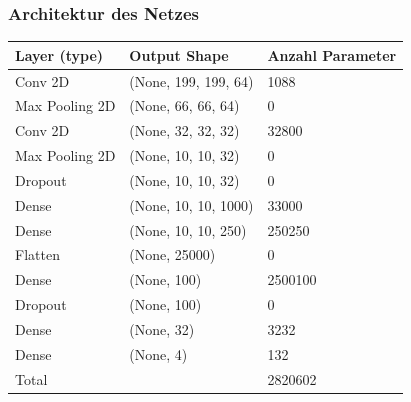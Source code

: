 \documentclass[aspectratio=1610, professionalfonts, 9pt]{beamer}
\begin{document}
\begin{frame}
    \frametitle{Architektur des Netzes}
    \begin{table}[htb]
        \centering
        \begin{tabular}{l
                        l
                        l}
            \toprule
            Layer (type)                      & Output Shape     & Anzahl Parameter      \\
            \midrule
            Conv 2D         & (None, 199, 199, 64)  & 1088 \\
            Max Pooling 2D  & (None, 66, 66, 64)    & 0 \\
            Conv 2D         & (None, 32, 32, 32)    & 32800 \\
            Max Pooling 2D  & (None, 10, 10, 32)    & 0 \\
            Dropout         & (None, 10, 10, 32)    & 0 \\
            Dense           & (None, 10, 10, 1000)  & 33000 \\
            Dense           & (None, 10, 10, 250)   & 250250 \\
            Flatten         & (None, 25000)         & 0 \\
            Dense           & (None, 100)           & 2500100 \\
            Dropout         & (None, 100)           & 0 \\
            Dense           & (None, 32)            & 3232 \\
            Dense           & (None, 4)             & 132 \\
            \midrule
            Total           &                       & 2820602 \\
            \bottomrule
        \end{tabular}
    \end{table}
\end{frame}
\end{document}
